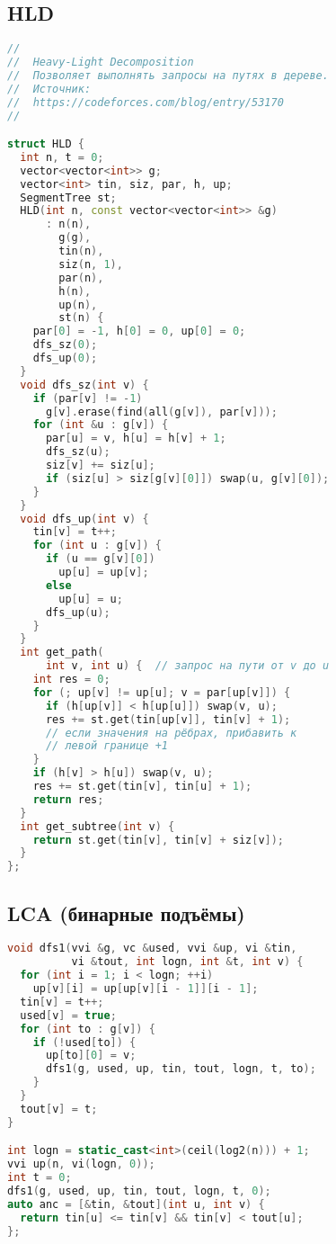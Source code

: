 \documentclass[10pt,a4paper,landscape,twosided]{extarticle}
\begin{document}
\begin{multicols}{3}
\subsection{HLD}
\begin{lstlisting}[language=C++]
//
//  Heavy-Light Decomposition
//  Позволяет выполнять запросы на путях в дереве.
//  Источник:
//  https://codeforces.com/blog/entry/53170
//

struct HLD {
  int n, t = 0;
  vector<vector<int>> g;
  vector<int> tin, siz, par, h, up;
  SegmentTree st;
  HLD(int n, const vector<vector<int>> &g)
      : n(n),
        g(g),
        tin(n),
        siz(n, 1),
        par(n),
        h(n),
        up(n),
        st(n) {
    par[0] = -1, h[0] = 0, up[0] = 0;
    dfs_sz(0);
    dfs_up(0);
  }
  void dfs_sz(int v) {
    if (par[v] != -1)
      g[v].erase(find(all(g[v]), par[v]));
    for (int &u : g[v]) {
      par[u] = v, h[u] = h[v] + 1;
      dfs_sz(u);
      siz[v] += siz[u];
      if (siz[u] > siz[g[v][0]]) swap(u, g[v][0]);
    }
  }
  void dfs_up(int v) {
    tin[v] = t++;
    for (int u : g[v]) {
      if (u == g[v][0])
        up[u] = up[v];
      else
        up[u] = u;
      dfs_up(u);
    }
  }
  int get_path(
      int v, int u) {  // запрос на пути от v до u
    int res = 0;
    for (; up[v] != up[u]; v = par[up[v]]) {
      if (h[up[v]] < h[up[u]]) swap(v, u);
      res += st.get(tin[up[v]], tin[v] + 1);
      // если значения на рёбрах, прибавить к
      // левой границе +1
    }
    if (h[v] > h[u]) swap(v, u);
    res += st.get(tin[v], tin[u] + 1);
    return res;
  }
  int get_subtree(int v) {
    return st.get(tin[v], tin[v] + siz[v]);
  }
};
\end{lstlisting}

\subsection{LCA (бинарные подъёмы)}
\begin{lstlisting}[language=C++]
void dfs1(vvi &g, vc &used, vvi &up, vi &tin,
          vi &tout, int logn, int &t, int v) {
  for (int i = 1; i < logn; ++i)
    up[v][i] = up[up[v][i - 1]][i - 1];
  tin[v] = t++;
  used[v] = true;
  for (int to : g[v]) {
    if (!used[to]) {
      up[to][0] = v;
      dfs1(g, used, up, tin, tout, logn, t, to);
    }
  }
  tout[v] = t;
}

int logn = static_cast<int>(ceil(log2(n))) + 1;
vvi up(n, vi(logn, 0));
int t = 0;
dfs1(g, used, up, tin, tout, logn, t, 0);
auto anc = [&tin, &tout](int u, int v) {
  return tin[u] <= tin[v] && tin[v] < tout[u];
};


\end{lstlisting}
\end{multicols}
\end{document}
